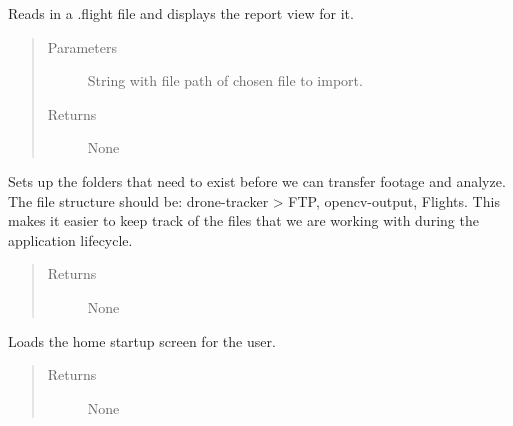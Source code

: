 \documentclass[letterpaper,10pt,english]{sphinxmanual}
\begin{document}
\begin{fulllineitems}
\begin{fulllineitems}
\label{\detokenize{index:src.Controllers.Program_Controller.Controller.import_flight}}
Reads in a .flight file and displays the report view for it.
\begin{quote}\begin{description}
\item[{Parameters}] \leavevmode
{} \textendash{} String with file path of chosen file to import.

\item[{Returns}] \leavevmode
None

\end{description}\end{quote}

\end{fulllineitems}


\begin{fulllineitems}
\label{\detokenize{index:src.Controllers.Program_Controller.Controller.setupFileStructure}}
Sets up the folders that need to exist before we can transfer footage and analyze. The file structure
should be: drone-tracker \textgreater{} FTP, opencv-output, Flights. This makes it easier to keep track of
the files that we are working with during the application lifecycle.
\begin{quote}\begin{description}
\item[{Returns}] \leavevmode
None

\end{description}\end{quote}

\end{fulllineitems}


\begin{fulllineitems}
\label{\detokenize{index:src.Controllers.Program_Controller.Controller.show_home}}
Loads the home startup screen for the user.
\begin{quote}\begin{description}
\item[{Returns}] \leavevmode
None


\end{description}
\end{quote}
\end{fulllineitems}
\end{fulllineitems}
\end{document}
